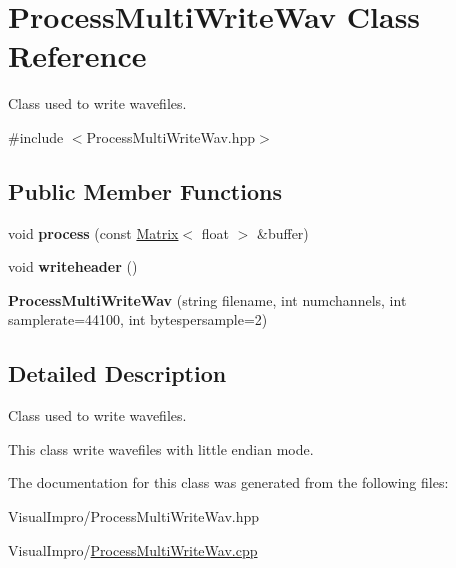 \hypertarget{class_process_multi_write_wav}{}\section{Process\+Multi\+Write\+Wav Class Reference}
\label{class_process_multi_write_wav}


Class used to write wavefiles.  




{\ttfamily \#include $<$Process\+Multi\+Write\+Wav.\+hpp$>$}

\subsection*{Public Member Functions}
\begin{DoxyCompactItemize}
\item 
\mbox{\label{class_process_multi_write_wav_a4b123093fced5f0327751a28e7e92fa5}} 
void {\bfseries process} (const \mbox{\hyperlink{class_matrix}{Matrix}}$<$ float $>$ \&buffer)
\item 
\mbox{\label{class_process_multi_write_wav_ab44ca1b53fd0c70bfe14b74dcc0ad378}} 
void {\bfseries writeheader} ()
\item 
\mbox{\label{class_process_multi_write_wav_aa116257dbccde379dcd13929e8429081}} 
{\bfseries Process\+Multi\+Write\+Wav} (string filename, int numchannels, int samplerate=44100, int bytespersample=2)
\end{DoxyCompactItemize}


\subsection{Detailed Description}
Class used to write wavefiles. 

This class write wavefiles with little endian mode. 

The documentation for this class was generated from the following files\+:\begin{DoxyCompactItemize}
\item 
Visual\+Impro/Process\+Multi\+Write\+Wav.\+hpp\item 
Visual\+Impro/\mbox{\hyperlink{_process_multi_write_wav_8cpp}{Process\+Multi\+Write\+Wav.\+cpp}}\end{DoxyCompactItemize}
